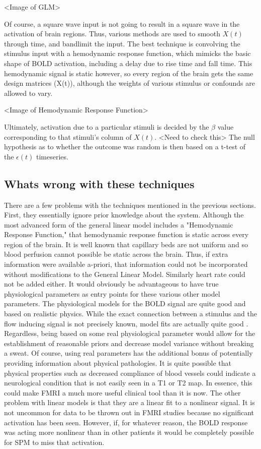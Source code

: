 \documentclass{article}
\begin{document}
<Image of GLM>

Of course, a square wave input is not going to result in a square wave
in the activation of brain regions. Thus, various methods are used to 
smooth $X(t)$ through time, and bandlimit the input. The best technique
is convolving the stimulus input with a hemodynamic response function,
which mimicks the basic shape of BOLD activation, including a delay
due to rise time and fall time. This hemodynamic signal is static however,
so every region of the brain gets the same design matrices (X(t)), 
although the weights of various stimulus or confounds are allowed to vary. 

<Image of Hemodynamic Response Function>

Ultimately, activation due to a particular stimuli is decided by the 
$\beta$ value corresponding to that stimuli's column of $X(t)$.
<Need to check this>
The null hypothesis as to whether the outcome was random is then
based on a t-test of the $\epsilon(t)$ timeseries. 

\subsection*{Whats wrong with these techniques}
There are a few problems with the techniques mentioned in the 
previous sections. First, they essentially ignore prior knowledge about
the system. Although the most advanced form of the general linear model includes
a "Hemodynamic Response Function," that hemodynamic response function is
static across every region of the brain. It is well known that capillary beds
are not uniform and so blood perfusion cannot possible be static across the
brain. Thus, if extra information were available a-priori, that information
could not be incorporated without modifications to the General Linear Model.
Similarly heart rate could not be added either. It would obviously be advantageous
to have true physiological parameters as entry points for these various other
model parameters. The physiological models for the BOLD signal are quite good
and based on realistic physics. While the exact connection between a stimulus
and the flow inducing signal is not precisely known, model fits are actually
quite good \cite{ModelCompareison}. Regardless, being based on some real 
physiological 
parameter would allow for the establishment of reasonable priors and decrease
model variance without breaking a sweat. Of course, using real parameters 
has the additional
bonus of potentially providing information about physical pathologies. It
is quite possible that physical properties such as decreased compliance of
blood vessels could indicate a neurological condition that is not easily
seen in a T1 or T2 map. In essence, this could make FMRI a much more 
useful clinical tool than it is now. The other problem with linear models
is that they are a linear fit to a nonlinear signal. It is not uncommon
for data to be thrown out in FMRI studies because no significant activation
has been seen. However, if, for whatever reason, the BOLD response
was acting more nonlinear than in other patients it would be completely
possible for SPM to miss that activation. 
\end{document}
